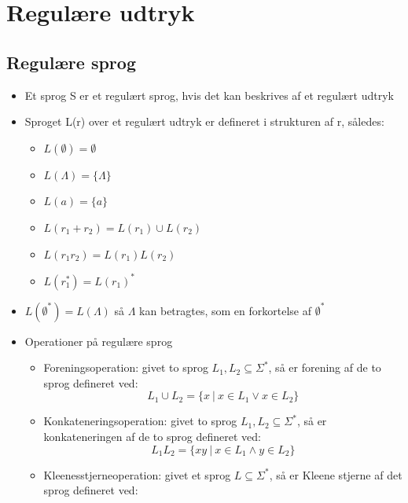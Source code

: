 \documentclass[a4, danish]{article}
\begin{document}
\maketitle
\newpage    
\tableofcontents

\newpage
\section{Regulære udtryk}
  \subsection{Regulære sprog}
  \begin{itemize}
    \item Et sprog S er et regulært sprog, hvis det kan beskrives af et regulært udtryk
    \item Sproget L(r) over et regulært udtryk er defineret i strukturen af r, således: 
    \begin{itemize}
      \item $L(\emptyset)=\emptyset $
      \item $L(\Lambda)=\{ \Lambda \}$
      \item $L(a)=\{a\}$
      \item $L(r_1+r_2)=L(r_1)\cup L(r_2)$
      \item $L(r_1r_2)=L(r_1)L(r_2)$
      \item $L(r_1^*)=L(r_1)^*$
    \end{itemize}
    \item $L(\emptyset^*)=L(\Lambda)$ så $\Lambda$ kan betragtes, som en forkortelse af $\emptyset^*$
    \item Operationer på regulære sprog
    \begin{itemize}
	    \item Foreningsoperation: givet to sprog $L_1,L_2\subseteq \Sigma^*$, så er forening af de to sprog defineret ved:
      \begin{equation*}
        L_1\cup L_2 = \{x \ | \ x\in L_1 \lor x\in L_2 \}
      \end{equation*}
      \item Konkateneringsoperation: givet to sprog $L_1,L_2\subseteq \Sigma^*$, så er konkateneringen af de to sprog defineret ved:
      \begin{equation*}
        L_1L_2= \{xy \ | \ x\in L_1 \land y\in L_2 \}
       \end{equation*}
      \item Kleenesstjerneoperation: givet et sprog $L \subseteq \Sigma^*$, så er Kleene stjerne af det sprog defineret ved:

\end{itemize}
\end{itemize}
\end{document}
